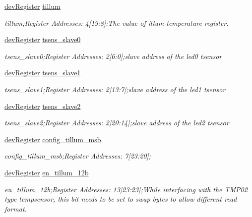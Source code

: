 \begin{DoxyCompactItemize}
\mbox{\hyperlink{classdev_register}{dev\+Register}} \mbox{\hyperlink{class_o_p_t3101_registers_ad48fe8274bed87d7263e6ca8269695f2}{tillum}}
\begin{DoxyCompactList}\small\item\em tillum;Register Addresses\+: 4\mbox{[}19\+:8\mbox{]};The value of illum-\/temperature register. \end{DoxyCompactList}\item 
\mbox{\hyperlink{classdev_register}{dev\+Register}} \mbox{\hyperlink{class_o_p_t3101_registers_a91767e4fdc957316f8468063681c3a15}{tsens\+\_\+slave0}}
\begin{DoxyCompactList}\small\item\em tsens\+\_\+slave0;Register Addresses\+: 2\mbox{[}6\+:0\mbox{]};slave address of the led0 tsensor \end{DoxyCompactList}\item 
\mbox{\hyperlink{classdev_register}{dev\+Register}} \mbox{\hyperlink{class_o_p_t3101_registers_a19285933a6b19db5099cfbface3fea9f}{tsens\+\_\+slave1}}
\begin{DoxyCompactList}\small\item\em tsens\+\_\+slave1;Register Addresses\+: 2\mbox{[}13\+:7\mbox{]};slave address of the led1 tsensor \end{DoxyCompactList}\item 
\mbox{\hyperlink{classdev_register}{dev\+Register}} \mbox{\hyperlink{class_o_p_t3101_registers_af6164a19c98ca0c161d14d83969f7f57}{tsens\+\_\+slave2}}
\begin{DoxyCompactList}\small\item\em tsens\+\_\+slave2;Register Addresses\+: 2\mbox{[}20\+:14\mbox{]};slave address of the led2 tsensor \end{DoxyCompactList}\item 
\mbox{\hyperlink{classdev_register}{dev\+Register}} \mbox{\hyperlink{class_o_p_t3101_registers_ae42fb1d446855e05fc71be4d953f7725}{config\+\_\+tillum\+\_\+msb}}
\begin{DoxyCompactList}\small\item\em config\+\_\+tillum\+\_\+msb;Register Addresses\+: 7\mbox{[}23\+:20\mbox{]}; \end{DoxyCompactList}\item 
\mbox{\hyperlink{classdev_register}{dev\+Register}} \mbox{\hyperlink{class_o_p_t3101_registers_a586f0e357ad3d049cccf267919fbea8a}{en\+\_\+tillum\+\_\+12b}}
\begin{DoxyCompactList}\small\item\em en\+\_\+tillum\+\_\+12b;Register Addresses\+: 13\mbox{[}23\+:23\mbox{]};While interfacing with the T\+M\+P02 type tempsensor, this bit needs to be set to swap bytes to allow different read format. \end{DoxyCompactList}\item 

\end{DoxyCompactItemize}
